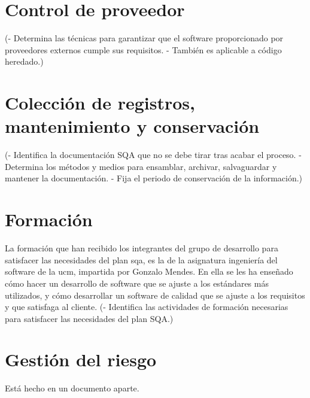 \documentclass[spanish,a4paper,11pt, twoside]{report}	%
\begin{document}
\newpage
\mbox{}
\thispagestyle{empty}						%
\newpage

\chapter{ Control de proveedor}
	(- Determina las técnicas para garantizar que el
	software proporcionado por proveedores externos
	cumple sus requisitos.
	- También es aplicable a código heredado.)

\newpage
\mbox{}
\thispagestyle{empty}						%
\newpage

\chapter{ Colección de registros, mantenimiento y conservación}
	(- Identifica la documentación SQA que no se debe
	tirar tras acabar el proceso.
	- Determina los métodos y medios para ensamblar,
	archivar, salvaguardar y mantener la documentación.
	- Fija el periodo de conservación de la información.)

\newpage
\mbox{}
\thispagestyle{empty}						%
\newpage

\chapter{ \hspace{0.25cm}Formación}
	La formación que han recibido los integrantes del grupo de desarrollo para satisfacer las necesidades del plan sqa, es la de la asignatura ingeniería del software de la ucm, impartida por Gonzalo Mendes. En ella se les ha enseñado 
	cómo hacer un desarrollo de software que se ajuste a los estándares más utilizados,  y cómo desarrollar un software de calidad que se ajuste a los requisitos y que satisfaga al cliente.
	(- Identifica las actividades de formación necesarias
	para satisfacer las necesidades del plan SQA.)

\newpage
\mbox{}
\thispagestyle{empty}						%
\newpage

\chapter{ \hspace{0.25cm}Gestión del riesgo}
	Está hecho en un documento aparte.

\end{document}
